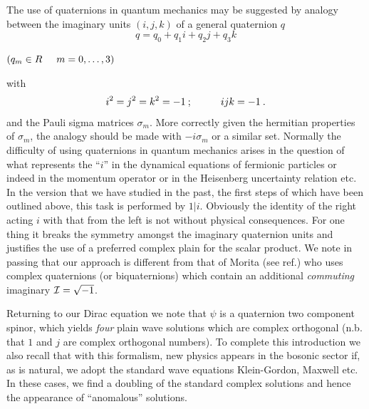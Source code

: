 The use of quaternions in quantum mechanics may be suggested by analogy
between the imaginary units $(i, j, k)$ of a general quaternion $q$
\begin{equation}
q = q_{0} + q_{1} i + q_{2} j + q_{3} k
\end{equation}
\begin{center}
$(q_{m}\in {\cal }R \hspace*{5mm} m=0, \ldots, 3)$
\end{center}
with
\begin{equation}
i^{2} = j^{2} = k^{2} = -1 \: ; \hspace*{10mm} i j k = -1 \: .
\end{equation}
and the Pauli sigma matrices $\sigma_{m}$. More correctly given the
hermitian properties of $\sigma_{m}$, the analogy should be made with
$-i \sigma_{m}$ or a similar set. Normally the difficulty of using
quaternions in quantum mechanics arises in the question of what represents
the ``$i$'' in the dynamical equations of fermionic particles or indeed in
the momentum operator or in the Heisenberg uncertainty relation etc. In the
version that we have studied in the past, the first steps of which have been
outlined above, this task is performed by $1\vert i$. Obviously the identity
of the right acting $i$ with that from the left is not without physical
consequences.
For one thing it breaks the symmetry amongst the imaginary quaternion
units and justifies the use of a preferred complex plain for the scalar
product. We note in passing that our approach is different from that of
Morita (see ref.\cite{mor2}) who uses complex
quaternions (or biquaternions) which contain an
additional {\em commuting} imaginary ${\cal I} = \sqrt{-1}$.

Returning to our Dirac equation we note that $\psi$ is a quaternion two
component spinor, which yields {\em four} plain wave solutions which are
complex orthogonal (n.b. that $1$ and $j$ are complex orthogonal numbers).
To complete this introduction we also recall that with this formalism, new
physics appears in the bosonic sector if, as is natural, we adopt the
standard wave equations Klein-Gordon, Maxwell etc. In these cases, we find a
doubling of the standard complex solutions and hence the appearance of
``anomalous'' solutions\cite{del1,rot2}.

